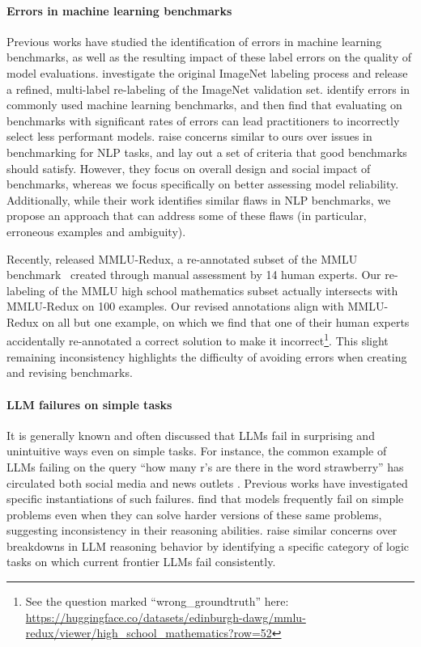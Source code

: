 \paragraph{Errors in machine learning benchmarks} Previous works have studied the identification of errors in machine learning benchmarks, as well as the resulting impact of these label errors on the quality of model evaluations. \citet{tsipras2020from} investigate the original ImageNet labeling process and %
release a refined, multi-label re-labeling of the ImageNet validation set. \citet{northcutt2021pervasive} identify errors in commonly used machine learning benchmarks, and then find that evaluating on benchmarks with significant rates of errors can lead practitioners to incorrectly select less performant models. \citet{bowman2021will} raise concerns similar to ours over issues in benchmarking for NLP tasks, and lay out a set of criteria that good benchmarks should satisfy.
However, they focus on overall design and social impact of benchmarks, whereas we focus specifically on better assessing model reliability. Additionally, while their work identifies similar flaws in NLP benchmarks, we propose an approach that can address some of these flaws (in particular, erroneous examples and ambiguity). %

Recently, \citet{gema2024we} released MMLU-Redux, a re-annotated subset of the MMLU benchmark~\cite{hendrycks2020measuring} created through manual assessment by 14 human experts. Our re-labeling of the MMLU high school mathematics subset actually intersects with MMLU-Redux on 100 examples. Our revised annotations align with MMLU-Redux on all but one example, on which we find that one of their human experts accidentally re-annotated a correct solution to make it incorrect\footnote{See the question marked ``wrong\_groundtruth'' here: \url{https://huggingface.co/datasets/edinburgh-dawg/mmlu-redux/viewer/high_school_mathematics?row=52}}. This slight remaining inconsistency highlights the difficulty of avoiding errors when creating and revising benchmarks.

\paragraph{LLM failures on simple tasks} It is generally known and often discussed that LLMs fail in surprising and unintuitive ways even on simple tasks. For instance, the common example of LLMs failing on the query ``how many r's are there in the word strawberry'' has circulated both social media and news outlets \cite{silberling2024strawberry}. Previous works have investigated specific instantiations of such failures. \citet{yang2024can} find that models frequently fail on simple problems even when they can solve harder versions of these same problems, suggesting inconsistency in their reasoning abilities. 
\citet{nezhurina2024alice} raise similar concerns over breakdowns in LLM reasoning behavior by identifying a specific category of logic tasks on which current frontier LLMs fail consistently.


